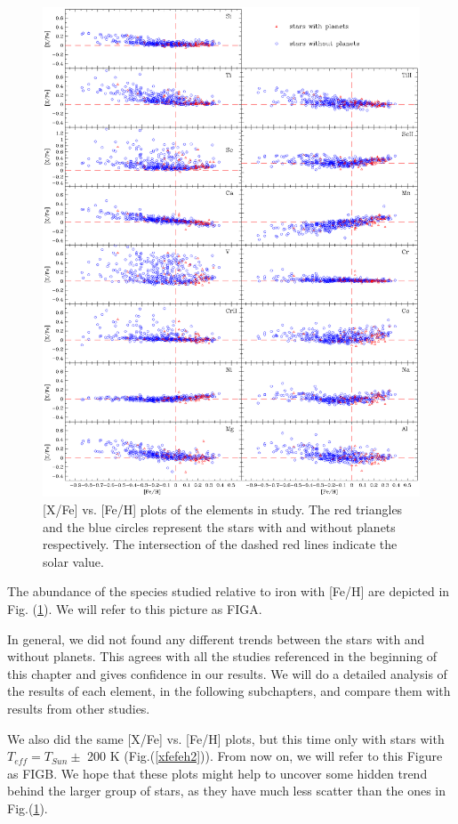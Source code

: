 \documentclass[dvips,12pt,a4paper]{report}
\begin{document}
{{\begin{figure}[h]
\centering
\includegraphics[width=16 cm, height=15 cm]{pics/parte4/xfefehfinal/xfefehfinal.eps}
\caption[abundance gfx]{[X/Fe] vs. [Fe/H] plots of the elements in study. The red triangles and the blue circles represent the stars with and without planets respectively. The intersection of the dashed red lines indicate the solar value.}
\label{xfefeh1}
\end{figure}

The abundance of the species studied relative to iron with [Fe/H] are depicted in Fig. (\ref{xfefeh1}). We will refer to this picture as FIGA. 

In general, we did not found any different trends between the stars with and without planets. This agrees with all the studies referenced in the beginning of this chapter and gives confidence in our results. We will do a detailed analysis of the results of each element, in the following subchapters, and compare them with results from other studies. 

We also did the same [X/Fe] vs. [Fe/H] plots, but this time only with stars with $T_{eff}=T_{Sun}\pm$ 200 K (Fig.(\ref{xfefeh2})). From now on, we will refer to this Figure as FIGB. We hope that these plots might help to uncover some  hidden trend behind the larger group of stars, as they have much less scatter than the ones in Fig.(\ref{xfefeh1}).

}}
\end{document}
